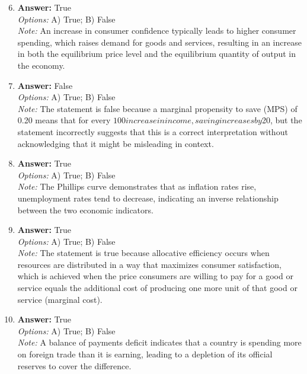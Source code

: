 \documentclass[12pt]{article}
\begin{document}
\begin{enumerate}[label=\arabic*.]
\setcounter{enumi}{5}
\item \textbf{Answer:} True
\\ \textit{Options:} A) True; B) False
\\ \textit{Note:} An increase in consumer confidence typically leads to higher consumer spending, which raises demand for goods and services, resulting in an increase in both the equilibrium price level and the equilibrium quantity of output in the economy.
\item \textbf{Answer:} False
\\ \textit{Options:} A) True; B) False
\\ \textit{Note:} The statement is false because a marginal propensity to save (MPS) of 0.20 means that for every $100 increase in income, saving increases by $20, but the statement incorrectly suggests that this is a correct interpretation without acknowledging that it might be misleading in context.
\item \textbf{Answer:} True
\\ \textit{Options:} A) True; B) False
\\ \textit{Note:} The Phillips curve demonstrates that as inflation rates rise, unemployment rates tend to decrease, indicating an inverse relationship between the two economic indicators.
\item \textbf{Answer:} True
\\ \textit{Options:} A) True; B) False
\\ \textit{Note:} The statement is true because allocative efficiency occurs when resources are distributed in a way that maximizes consumer satisfaction, which is achieved when the price consumers are willing to pay for a good or service equals the additional cost of producing one more unit of that good or service (marginal cost).
\item \textbf{Answer:} True
\\ \textit{Options:} A) True; B) False
\\ \textit{Note:} A balance of payments deficit indicates that a country is spending more on foreign trade than it is earning, leading to a depletion of its official reserves to cover the difference.
\end{enumerate}
\end{document}
